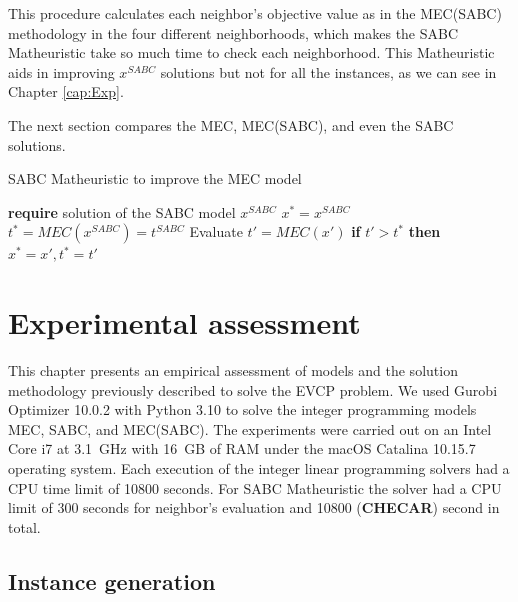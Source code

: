 This procedure calculates each neighbor's objective value as in the MEC(SABC) methodology in the four different neighborhoods, which makes the SABC Matheuristic take so much time to check each neighborhood. This Matheuristic aids in improving $x^{SABC}$ solutions but not for all the instances, as we can see in Chapter \ref{cap:Exp}.


The next section compares the MEC, MEC(SABC), and even the SABC solutions.  



\begin{algorithm}
\caption{SABC Matheuristic to improve the MEC model}\label{alg:cap_1}
\begin{algorithmic}[1]
\State \textbf{require} solution of the SABC model $x^{SABC}$
\State $x^* = x^{SABC}$
\State $t^* = MEC(x^{SABC}) = t^{SABC}$
		\State Evaluate $t'=MEC(x')$ 
    	\State \textbf{if } $t' > t^*$ \textbf{then}  $x^* = x', t^*=t'$ 
    \EndFor
\EndWhile
{}
\end{algorithmic}
\end{algorithm}



\chapter{Experimental assessment}\label{Exp}

  This chapter presents an empirical assessment of models and the solution methodology previously described to solve the EVCP problem.  
We used Gurobi Optimizer 10.0.2 with Python 3.10 to solve the integer programming models MEC, SABC, and MEC(SABC).
The experiments were carried out on an Intel Core i7 at 3.1~GHz with 16~GB of RAM under the macOS Catalina 10.15.7 operating system. Each execution of the integer linear programming solvers had a CPU time limit of 10800 seconds. For SABC Matheuristic the solver had a CPU limit of 300 seconds for neighbor's evaluation and 10800 (\textbf{CHECAR}) second in total.

\section{Instance generation} \label{instances}

